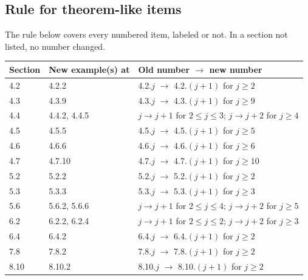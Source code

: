 \documentclass[12pt,letterpaper]{article}
\begin{document}
\subsection{Rule for theorem-like items}
The rule below covers every numbered item, labeled or not. In a section not listed, no number changed.
\begin{center}
\begin{tabular}{@{}lll@{}}\toprule
Section & New example(s) at & Old number $\to$ new number\\\midrule
4.2 & 4.2.2 & 4.2.$j$ $\to$ 4.2.$(j{+}1)$ for $j\ge2$\\
4.3 & 4.3.9 & 4.3.$j$ $\to$ 4.3.$(j{+}1)$ for $j\ge9$\\
4.4 & 4.4.2, 4.4.5 & $j\to j{+}1$ for $2\le j\le3$; $j\to j{+}2$ for $j\ge4$\\
4.5 & 4.5.5 & 4.5.$j$ $\to$ 4.5.$(j{+}1)$ for $j\ge5$\\
4.6 & 4.6.6 & 4.6.$j$ $\to$ 4.6.$(j{+}1)$ for $j\ge6$\\
4.7 & 4.7.10 & 4.7.$j$ $\to$ 4.7.$(j{+}1)$ for $j\ge10$\\
5.2 & 5.2.2 & 5.2.$j$ $\to$ 5.2.$(j{+}1)$ for $j\ge2$\\
5.3 & 5.3.3 & 5.3.$j$ $\to$ 5.3.$(j{+}1)$ for $j\ge3$\\
5.6 & 5.6.2, 5.6.6 & $j\to j{+}1$ for $2\le j\le4$; $j\to j{+}2$ for $j\ge5$\\
6.2 & 6.2.2, 6.2.4 & $j\to j{+}1$ for $2\le j\le2$; $j\to j{+}2$ for $j\ge3$\\
6.4 & 6.4.2 & 6.4.$j$ $\to$ 6.4.$(j{+}1)$ for $j\ge2$\\
7.8 & 7.8.2 & 7.8.$j$ $\to$ 7.8.$(j{+}1)$ for $j\ge2$\\
8.10 & 8.10.2 & 8.10.$j$ $\to$ 8.10.$(j{+}1)$ for $j\ge2$\\
\bottomrule\end{tabular}
\end{center}
\end{document}
